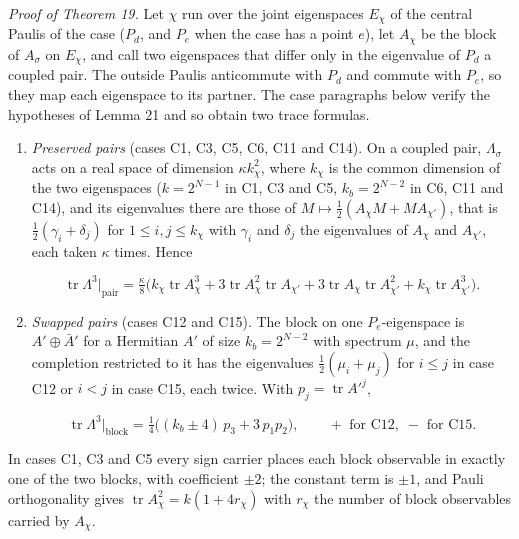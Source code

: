 \documentclass[11pt,a4paper]{article}
\newcommand{\lt}{<}
\begin{document}
\emph{Proof of Theorem 19.} Let \(\chi\) run over the joint eigenspaces \(E_\chi\) of the central Paulis of the
case (\(P_d\), and \(P_e\) when the case has a point \(e\)), let \(A_\chi\) be the block of \(A_\sigma\) on \(E_\chi\), and call two
eigenspaces that differ only in the eigenvalue of \(P_d\) a coupled pair. The outside Paulis anticommute
with \(P_d\) and commute with \(P_e\), so they map each eigenspace to its partner. The case paragraphs below
verify the hypotheses of Lemma 21 and so obtain two trace formulas.

\begin{enumerate}
\def\labelenumi{\arabic{enumi}.}
\item
  \emph{Preserved pairs} (cases C1, C3, C5, C6, C11 and C14). On a coupled pair, \(\Lambda_\sigma\) acts on a
  real space of dimension \(\kappa k_\chi^2\), where \(k_\chi\) is the common dimension of the two
  eigenspaces (\(k=2^{N-1}\) in C1, C3 and C5, \(k_b=2^{N-2}\) in C6, C11 and C14), and its eigenvalues
  there are those of \(M\mapsto\frac12(A_\chi M+MA_{\chi'})\), that is \(\frac12(\gamma_i+\delta_j)\) for
  \(1\le i,j\le k_\chi\) with \(\gamma_i\) and \(\delta_j\) the eigenvalues of \(A_\chi\) and \(A_{\chi'}\), each taken
  \(\kappa\) times. Hence

  \[\operatorname{tr}\Lambda^3\big|_{\text{pair}}=\tfrac\kappa8\bigl(k_\chi\operatorname{tr}A_\chi^3+3\operatorname{tr}A_\chi^2\operatorname{tr}A_{\chi'}
  +3\operatorname{tr}A_\chi\operatorname{tr}A_{\chi'}^2+k_\chi\operatorname{tr}A_{\chi'}^3\bigr).
  \tag{E8}\]
\item
  \emph{Swapped pairs} (cases C12 and C15). The block on one \(P_e\)-eigenspace is \(A'\oplus\bar A'\) for a
  Hermitian \(A'\) of size \(k_b=2^{N-2}\) with spectrum \(\mu\), and the completion restricted to it has the
  eigenvalues \(\frac12(\mu_i+\mu_j)\) for \(i\le j\) in case C12 or \(i\lt j\) in case C15, each twice. With
  \(p_j=\operatorname{tr}A'^j\),

  \[\operatorname{tr}\Lambda^3\big|_{\text{block}}=\tfrac14\bigl((k_b\pm4)\,p_3+3\,p_1p_2\bigr),\qquad+\text{ for C12},\;-\text{ for C15}.
  \tag{E9}\]
\end{enumerate}

In cases C1, C3 and C5 every sign carrier places each block observable in exactly one of the two
blocks, with coefficient \(\pm2\); the constant term is \(\pm1\), and Pauli orthogonality gives
\(\operatorname{tr}A_\chi^2=k(1+4r_\chi)\) with \(r_\chi\) the number of block observables carried by \(A_\chi\).
\end{document}
